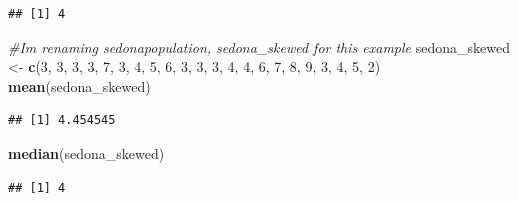 \documentclass[
]{book}
\newenvironment{Shaded}{\begin{snugshade}}{\end{snugshade}}
\newcommand{\CommentTok}[1]{\textcolor[rgb]{0.56,0.35,0.01}{\textit{#1}}}
\newcommand{\DecValTok}[1]{\textcolor[rgb]{0.00,0.00,0.81}{#1}}
\newcommand{\FunctionTok}[1]{\textcolor[rgb]{0.13,0.29,0.53}{\textbf{#1}}}
\newcommand{\NormalTok}[1]{#1}
\newcommand{\OtherTok}[1]{\textcolor[rgb]{0.56,0.35,0.01}{#1}}
\begin{document}
\begin{verbatim}
## [1] 4
\end{verbatim}

\begin{Shaded}
\begin{Highlighting}[]
\CommentTok{\#I\textquotesingle{}m renaming sedonapopulation, sedona\_skewed for this example}
\NormalTok{sedona\_skewed }\OtherTok{\textless{}{-}} \FunctionTok{c}\NormalTok{(}\DecValTok{3}\NormalTok{, }\DecValTok{3}\NormalTok{, }\DecValTok{3}\NormalTok{, }\DecValTok{3}\NormalTok{, }\DecValTok{7}\NormalTok{, }\DecValTok{3}\NormalTok{, }\DecValTok{4}\NormalTok{, }\DecValTok{5}\NormalTok{, }\DecValTok{6}\NormalTok{, }\DecValTok{3}\NormalTok{, }\DecValTok{3}\NormalTok{, }\DecValTok{3}\NormalTok{, }\DecValTok{4}\NormalTok{, }\DecValTok{4}\NormalTok{, }\DecValTok{6}\NormalTok{, }\DecValTok{7}\NormalTok{, }\DecValTok{8}\NormalTok{, }\DecValTok{9}\NormalTok{, }\DecValTok{3}\NormalTok{, }\DecValTok{4}\NormalTok{, }\DecValTok{5}\NormalTok{, }\DecValTok{2}\NormalTok{)}
\FunctionTok{mean}\NormalTok{(sedona\_skewed)}
\end{Highlighting}
\end{Shaded}

\begin{verbatim}
## [1] 4.454545
\end{verbatim}

\begin{Shaded}
\begin{Highlighting}[]
\FunctionTok{median}\NormalTok{(sedona\_skewed)}
\end{Highlighting}
\end{Shaded}

\begin{verbatim}
## [1] 4
\end{verbatim}
\end{document}
